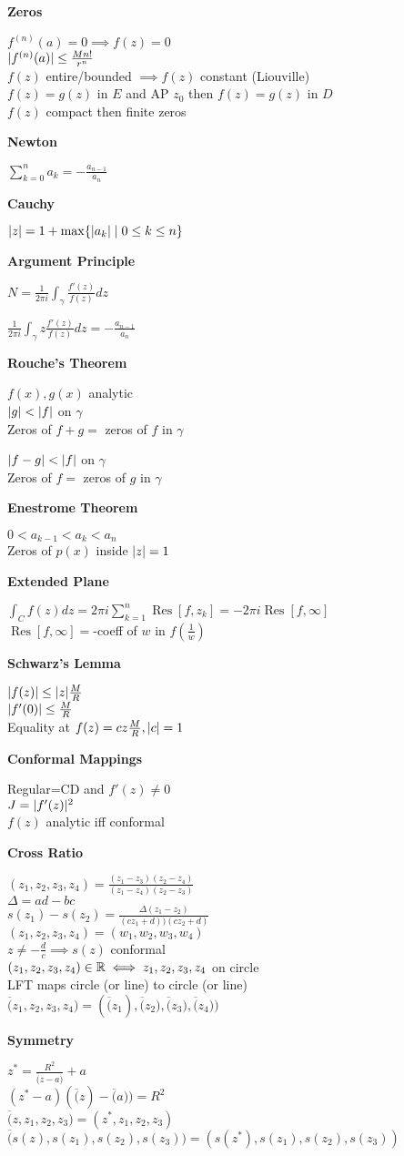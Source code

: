 \documentclass[letterpaper,12pt,fleqn,twocolumn]{article}
\newcommand{\g}{\gamma}
\newcommand{\D}{\Delta}
\newcommand{\conj}[1]{\overline{#1}}
\DeclareMathOperator{\Res}{Res}
\begin{document}
\textbf{Zeros}

$f^{(n)}(a)=0\implies f(z)=0$ \\
$\lvert f^{(n)}(a)\rvert\le\frac{Mn!}{r^n}$ \\
$f(z)$ entire/bounded $\implies f(z)$ constant (Liouville) \\
$f(z)=g(z)$ in $E$ and AP $z_0$ then $f(z)=g(z)$ in $D$ \\
$f(z)$ compact then finite zeros

\textbf{Newton}

$\sum_{k=0}^na_k=-\frac{a_{n-1}}{a_n}$

\textbf{Cauchy}

$\lvert z\rvert=1+\max\{\lvert a_k\rvert\mid0\le k\le n\}$

\textbf{Argument Principle}

$N=\frac{1}{2\pi i}\int_{\g}\frac{f'(z)}{f(z)}dz$

$\frac{1}{2\pi i}\int_{\g}z\frac{f'(z)}{f(z)}dz=-\frac{a_{n-1}}{a_n}$

\textbf{Rouche's Theorem}

$f(x),g(x)$ analytic \\
$\lvert g\rvert<\lvert f\rvert$ on $\g$ \\
Zeros of $f+g=$ zeros of $f$ in $\g$

$\lvert f-g\rvert<\lvert f\rvert$ on $\g$ \\
Zeros of $f=$ zeros of $g$ in $\g$

\textbf{Enestrome Theorem}

$0<a_{k-1}<a_k<a_n$ \\
Zeros of $p(x)$ inside $\lvert z\rvert=1$

\textbf{Extended Plane}

$\int_Cf(z)dz=2\pi i\sum_{k=1}^n\Res[f,z_k]=-2\pi i\Res[f,\infty]$ \\
$\Res[f,\infty]=$-coeff of $w$ in $f(\frac{1}{w})$

\textbf{Schwarz's Lemma}

$\lvert f(z)\rvert\le\lvert z\rvert\frac{M}{R}$ \\
$\lvert f'(0)\rvert\le\frac{M}{R}$ \\
Equality at $f(z)=cz\frac{M}{R},\lvert c\rvert=1$

\textbf{Conformal Mappings}

Regular=CD and $f'(z)\ne0$ \\
$J=\lvert f'(z)\rvert^2$ \\
$f(z)$ analytic iff conformal

\textbf{Cross Ratio}

$(z_1,z_2,z_3,z_4)=\frac{(z_1-z_3)(z_2-z_4)}{(z_1-z_4)(z_2-z_3)}$ \\
$\D=ad-bc$ \\
$s(z_1)-s(z_2)=\frac{\D(z_1-z_2)}{(cz_1+d))(cz_2+d)}$ \\
$(z_1,z_2,z_3,z_4)=(w_1,w_2,w_3,w_4)$ \\
$z\ne-\frac{d}{c}\implies s(z)$ conformal \\
$(z_1,z_2,z_3,z_4)\in\mathbb{R}\iff z_1,z_2,z_3,z_4$ on circle \\
LFT maps circle (or line) to circle (or line) \\
$\conj(z_1,z_2,z_3,z_4)=(\conj(z_1),\conj(z_2),\conj(z_3),\conj(z_4))$

\textbf{Symmetry}

$z^*=\frac{R^2}{\conj(z-a)}+a$ \\
$(z^*-a)(\conj(z)-\conj(a))=R^2$ \\
$\conj(z,z_1,z_2,z_3)=(z^*,z_1,z_2,z_3)$ \\
$\conj(s(z),s(z_1),s(z_2),s(z_3))=(s(z^*),s(z_1),s(z_2),s(z_3))$
\end{document}
